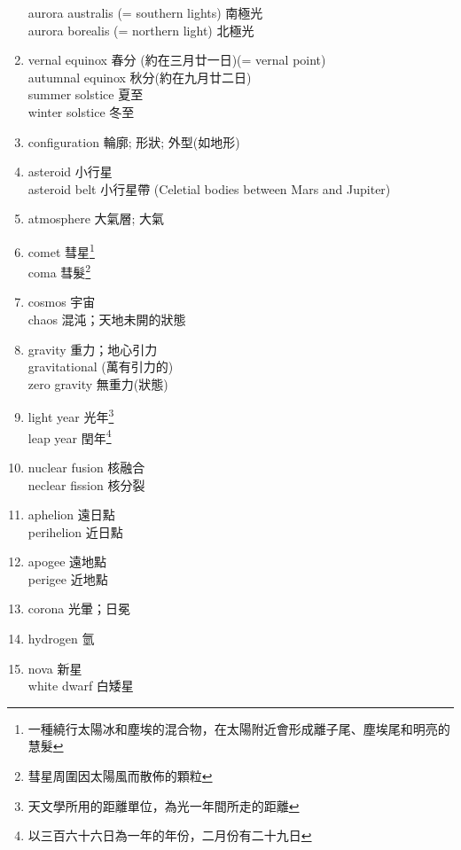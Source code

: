 \documentclass[twoside,b5paper]{book}
\begin{document}
\begin{enumerate}
      aurora australis (= southern lights) 南極光\\
      aurora borealis (= northern light) 北極光
    \item
      vernal equinox 春分 (約在三月廿一日)(= vernal point)\\
      autumnal equinox  秋分(約在九月廿二日)\\
      summer solstice  夏至\\
      winter solstice 冬至
    \item
      configuration 輪廓; 形狀; 外型(如地形)
    \item
      asteroid  小行星\\
      asteroid belt 小行星帶 (Celetial bodies between Mars and Jupiter)
    \item
      atmosphere  大氣層; 大氣
    \item
      comet 彗星\footnote{一種繞行太陽冰和塵埃的混合物，在太陽附近會形成離子尾、塵埃尾和明亮的慧髮}\\
      coma  彗髮\footnote{彗星周圍因太陽風而散佈的顆粒}\\
    \item
      cosmos  宇宙\\
      chaos 混沌；天地未開的狀態
    \item
      gravity  重力；地心引力\\
      gravitational  (萬有引力的)\\
      zero gravity 無重力(狀態)
    \item
      light year 光年\footnote{天文學所用的距離單位，為光一年間所走的距離}\\
      leap year 閏年\footnote{以三百六十六日為一年的年份，二月份有二十九日}
    \item
      nuclear fusion 核融合\\
      neclear fission 核分裂
    \item
      aphelion  遠日點\\
      perihelion  近日點
    \item
      apogee  遠地點\\
      perigee  近地點
    \item
      corona  光暈；日冕
    \item
      hydrogen  氫
    \item
      nova 新星\\
      white dwarf 白矮星
  \end{enumerate}
\end{document}
